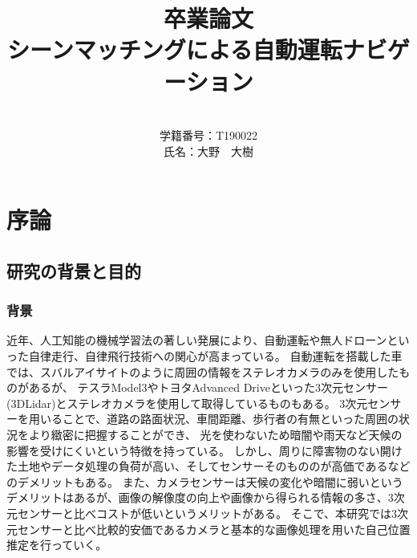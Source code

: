 \documentclass[titlepage,dvipdfmx]{jsarticle}
\begin{document}
\title{卒業論文\\シーンマッチングによる自動運転ナビゲーション\\}
\author{\\学籍番号：T190022\\氏名：大野　大樹}

\maketitle
\tableofcontents
\newpage
\section{序論}
\subsection{研究の背景と目的}
\subsubsection{背景}
近年、人工知能の機械学習法の著しい発展により、自動運転や無人ドローンといった自律走行、自律飛行技術への関心が高まっている。
自動運転を搭載した車では、スバルアイサイト\cite{f1}のように周囲の情報をステレオカメラのみを使用したものがあるが、
テスラModel3\cite{f2}やトヨタAdvanced Drive\cite{f3}といった3次元センサー(3DLidar)とステレオカメラを使用して取得しているものもある。
3次元センサーを用いることで、道路の路面状況、車間距離、歩行者の有無といった周囲の状況をより緻密に把握することができ、
光を使わないため暗闇や雨天など天候の影響を受けにくいという特徴を持っている。
しかし、周りに障害物のない開けた土地やデータ処理の負荷が高い、そしてセンサーそのもののが高価であるなどのデメリットもある。
また、カメラセンサーは天候の変化や暗闇に弱いというデメリットはあるが、画像の解像度の向上や画像から得られる情報の多さ、3次元センサーと比べコストが低いというメリットがある。
そこで、本研究では3次元センサーと比べ比較的安価であるカメラと基本的な画像処理を用いた自己位置推定を行っていく。
\end{document}
